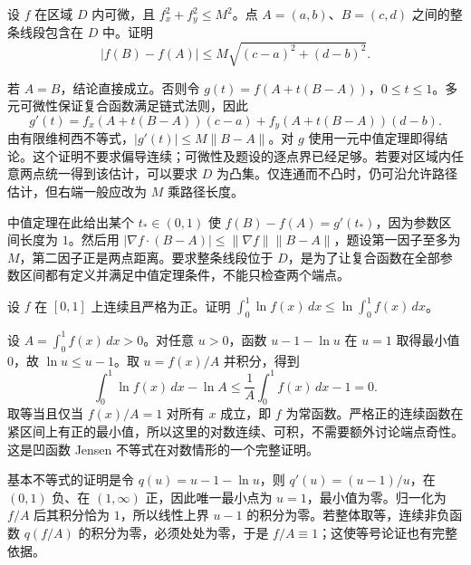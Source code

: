 \documentclass[12pt,fontset=fandol]{ctexart}
\begin{document}
\begin{example}\label{nm-2018-5}
设 $f$ 在区域 $D$ 内可微，且 $f_x^2+f_y^2\leq M^2$。点 $A=(a,b)$、$B=(c,d)$ 之间的整条线段包含在 $D$ 中。证明
\[
 |f(B)-f(A)|\leq M\sqrt{(c-a)^2+(d-b)^2}.
\]
\end{example}
\begin{solve}
若 $A=B$，结论直接成立。否则令 $g(t)=f(A+t(B-A))$，$0\leq t\leq1$。多元可微性保证复合函数满足链式法则，因此
\[
 g'(t)=f_x(A+t(B-A))(c-a)+f_y(A+t(B-A))(d-b).
\]
由有限维柯西不等式，$|g'(t)|\leq M\|B-A\|$。对 $g$ 使用一元中值定理即得结论。这个证明不要求偏导连续；可微性及题设的逐点界已经足够。若要对区域内任意两点统一得到该估计，可以要求 $D$ 为凸集。仅连通而不凸时，仍可沿允许路径估计，但右端一般应改为 $M$ 乘路径长度。

中值定理在此给出某个 $t_*\in(0,1)$ 使 $f(B)-f(A)=g'(t_*)$，因为参数区间长度为 $1$。然后用 $|\nabla f\cdot(B-A)|\le\|\nabla f\|\|B-A\|$，题设第一因子至多为 $M$，第二因子正是两点距离。要求整条线段位于 $D$，是为了让复合函数在全部参数区间都有定义并满足中值定理条件，不能只检查两个端点。

\end{solve}

\begin{example}\label{nm-2018-6}
设 $f$ 在 $[0,1]$ 上连续且严格为正。证明 $\displaystyle\int_0^1\ln f(x)\,dx\leq\ln\int_0^1f(x)\,dx$。
\end{example}
\begin{solve}
设 $A=\int_0^1f(x)\,dx>0$。对任意 $u>0$，函数 $u-1-\ln u$ 在 $u=1$ 取得最小值0，故 $\ln u\leq u-1$。取 $u=f(x)/A$ 并积分，得到
\[
 \int_0^1\ln f(x)\,dx-\ln A
 \leq\frac1A\int_0^1f(x)\,dx-1=0.
\]
取等当且仅当 $f(x)/A=1$ 对所有 $x$ 成立，即 $f$ 为常函数。严格正的连续函数在紧区间上有正的最小值，所以这里的对数连续、可积，不需要额外讨论端点奇性。这是凹函数 Jensen 不等式在对数情形的一个完整证明。

基本不等式的证明是令 $q(u)=u-1-\ln u$，则 $q'(u)=(u-1)/u$，在 $(0,1)$ 负、在 $(1,\infty)$ 正，因此唯一最小点为 $u=1$，最小值为零。归一化为 $f/A$ 后其积分恰为 $1$，所以线性上界 $u-1$ 的积分为零。若整体取等，连续非负函数 $q(f/A)$ 的积分为零，必须处处为零，于是 $f/A\equiv1$；这使等号论证也有完整依据。

\end{solve}
\end{document}
